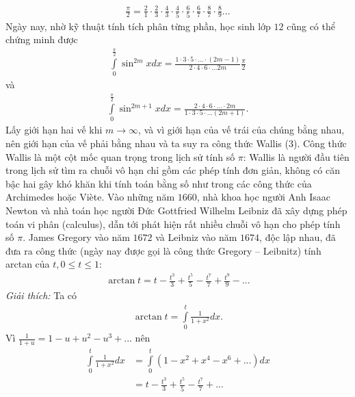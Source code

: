 \begin{multicols}{2}
	\begin{align*}
		\frac{\pi }{2} = \frac{2}{1} \cdot \frac{2}{3} \cdot \frac{4}{3} \cdot \frac{4}{5} \cdot \frac{6}{5} \cdot \frac{6}{7} \cdot \frac{8}{7} \cdot \frac{8}{9}... \tag{$3$}
	\end{align*}
	Ngày nay, nhờ kỹ thuật tính tích phân từng phần, học sinh lớp $12$ cũng có thể chứng minh được 
	\begin{align*}
		\int\limits_0^{\frac{\pi }{2}} {{{\sin }^{2m}}xdx = \frac{{1 \cdot 3 \cdot 5 \cdot ... \cdot \left( {2m - 1} \right)}}{{2 \cdot 4 \cdot 6 \cdot ...2m}}} \frac{\pi }{2}
	\end{align*}
	và
	\begin{align*}
		\int\limits_0^{\frac{\pi }{2}} {{{\sin }^{2m + 1}}xdx = \frac{{2 \cdot 4 \cdot 6 \cdot ... \cdot 2m}}{{1 \cdot 3 \cdot 5 \cdot ...\left( {2m + 1} \right)}}} .
	\end{align*}
	Lấy giới hạn hai vế khi $m \to \infty$, và vì giới hạn của vế trái của chúng bằng nhau, nên giới hạn của vế phải  bằng nhau và ta suy ra công thức Wallis ($3$).
	\vskip 0.1cm
	Công thức Wallis là một cột mốc quan trọng trong lịch sử tính số $\pi$: Wallis là người đầu tiên trong lịch sử tìm ra chuỗi vô hạn chỉ gồm các phép tính đơn giản, không có căn bậc hai gây khó khăn khi tính toán bằng số như trong các công thức của Archimedes hoặc Viète.  
	\vskip 0.1cm
	Vào những năm $1660$, nhà khoa học người Anh Isaac Newton  và nhà toán học người Đức Gottfried Wilhelm Leibniz đã xây dựng phép toán vi phân (calculus), dẫn tới phát hiện rất nhiều chuỗi vô hạn cho phép tính \linebreak số $\pi$.
	\vskip 0.1cm  
	James Gregory vào năm $1672$ và Leibniz vào năm $1674$, độc lập nhau, đã đưa ra công thức (ngày nay được gọi là công thức Gregory -- Leibnitz) tính arctan của  $t, 0 \le t\le 1$:
	\begin{align*}
		\arctan t = t - \frac{{{t^3}}}{3} + \frac{{{t^5}}}{5} - \frac{{{t^7}}}{7} + \frac{{{t^9}}}{9} - ... \tag{$4$}
	\end{align*}
	\textit{Giải thích:} Ta có 
	\begin{align*}
		\arctan t = \int\limits_0^t {\frac{1}{{1 + {x^2}}}dx} .
	\end{align*}
	Vì $\frac{1}{{1 + u}} = 1 - u + {u^2} - {u^3} + ...$   nên
	\begin{align*}
			\int\limits_0^t {\frac{1}{{1 + {x^2}}}dx}  &= \int\limits_0^t {\left( {1 - {x^2} + {x^4} - {x^6} + ...} \right)dx} \\
			&= t - \frac{{{t^3}}}{3} + \frac{{{t^5}}}{5} - \frac{{{t^7}}}{7} + ...

\end{align*}
\end{multicols}
